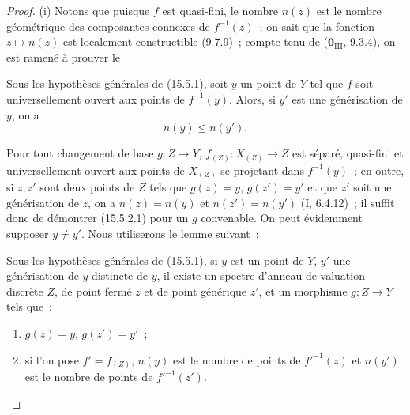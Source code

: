 \begin{proof}
(i) Notons que puisque $f$ est quasi-fini, le nombre $n(z)$ est le nombre géométrique des composantes connexes de $f^{-1}(z)$~; on sait que la fonction $z\mapsto n(z)$ est localement constructible (9.7.9)~; compte tenu de ($\mathbf{0}_{\mathrm{III}}$, 9.3.4), on est ramené à prouver le

\begin{corollary}[15.5.2]
Sous les hypothèses générales de (15.5.1), soit $y$ un point de $Y$ tel que $f$ soit universellement ouvert aux points de $f^{-1}(y)$. Alors, si $y'$ est une générisation de $y$, on a
\begin{equation}
\tag{15.5.2.1}
\label{IV.15.5.2.1-fr}
  n(y)\leqslant n(y').
\end{equation}
\end{corollary}

Pour tout changement de base $g:Z\to Y$, $f_{(Z)}:X_{(Z)}\to Z$ est séparé, quasi-fini et universellement ouvert aux points de $X_{(Z)}$ se projetant dans $f^{-1}(y)$~; en outre, si $z,z'$ sont deux points de $Z$ tels que $g(z)=y$, $g(z')=y'$ et que $z'$ soit une générisation de $z$, on a $n(z)=n(y)$ et $n(z')=n(y')$ (I, 6.4.12)~; il suffit donc de démontrer (15.5.2.1) pour un $g$ convenable. On peut évidemment supposer $y\ne y'$. Nous utiliserons le lemme suivant~:

\begin{lemma}[15.5.2.2]
\label{IV.15.5.2.2-fr}
Sous les hypothèses générales de (15.5.1), si $y$ est un point de $Y$, $y'$ une générisation de $y$ distincte de $y$, il existe un spectre d'anneau de valuation discrète $Z$, de point fermé $z$ et de point générique $z'$, et un morphisme $g:Z\to Y$ tels que~:
\begin{enumerate}[label=\emph{\arabic*\textsuperscript{\textdegree}}]
  \item $g(z)=y$, $g(z')=y'$~;
  \item si l'on pose $f'=f_{(Z)}$, $n(y)$ est le nombre de points de $f'^{-1}(z)$ et $n(y')$ est le nombre de points de $f'^{-1}(z')$.
\end{enumerate}
\end{lemma}


\end{proof}
